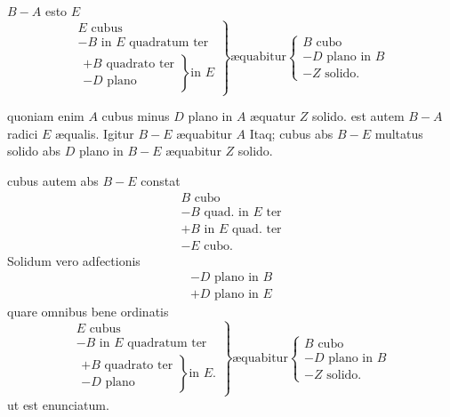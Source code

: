\documentclass[11pt,a4paper]{article}
\begin{document}
$B - A$ esto $E$
\[ \left.\begin{array}{l} E \text{ cubus} \\ - B \text{ in } E \text{ quadratum ter} \\ \left.\begin{array}{l} + B \text{ quadrato ter} \\ - D \text{ plano} \end{array}\right\} \text{in } E \end{array}\right\} \text{æquabitur} \left\{\begin{array}{l} B \text{ cubo} \\ - D \text{ plano in } B \\ - Z \text{ solido.} \end{array}\right. \]

quoniam enim $A$ cubus minus $D$ plano in $A$ æquatur $Z$ solido. est autem $B - A$ radici $E$ æqualis. Igitur $B - E$ æquabitur $A$ Itaq; cubus abs $B - E$ multatus solido abs $D$ plano in $B - E$ æquabitur $Z$ solido.

cubus autem abs $B - E$ constat
\[ \begin{array}{l} B \text{ cubo} \\ - B \text{ quad. in } E \text{ ter} \\ + B \text{ in } E \text{ quad. ter} \\ - E \text{ cubo.} \end{array} \]
Solidum vero adfectionis
\[ \begin{array}{l} - D \text{ plano in } B \\ + D \text{ plano in } E \end{array} \]
quare omnibus bene ordinatis
\[ \left.\begin{array}{l} E \text{ cubus} \\ - B \text{ in } E \text{ quadratum ter} \\ \left.\begin{array}{l} + B \text{ quadrato ter} \\ - D \text{ plano} \end{array}\right\} \text{in } E. \end{array}\right\} \text{æquabitur} \left\{\begin{array}{l} B \text{ cubo} \\ - D \text{ plano in } B \\ - Z \text{ solido.} \end{array}\right. \]
ut est enunciatum.
\end{document}
